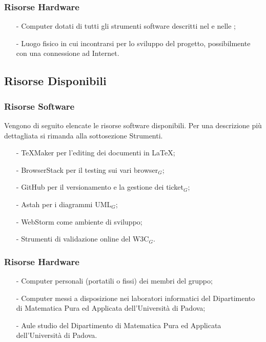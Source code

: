 \subsubsection{Risorse Hardware}
\begin{itemize}
	\item[-] Computer dotati di tutti gli strumenti software descritti nel \PdQ{} e nelle \NdP ;
	\item[-] Luogo fisico in cui incontrarsi per lo sviluppo del progetto, possibilmente con una connessione ad Internet.
\end{itemize}

\subsection{Risorse Disponibili}
\subsubsection{Risorse Software}
Vengono di seguito elencate le risorse software disponibili. Per una descrizione più dettagliata si rimanda alla sottosezione Strumenti.
\begin{itemize}
	\item[-] TeXMaker per l'editing dei documenti in \LaTeX;
	\item[-] BrowserStack per il testing sui vari browser$_G$;
	\item[-] GitHub per il versionamento e la gestione dei ticket$_G$;
	\item[-] Astah per i diagrammi UML$_G$;
	\item[-] WebStorm come ambiente di sviluppo;
	\item[-] Strumenti di validazione online del W3C$_G$.
\end{itemize}

\subsubsection{Risorse Hardware}
\begin{itemize}
	\item[-] Computer personali (portatili o fissi) dei membri del gruppo; 
	\item[-] Computer messi a disposizione nei laboratori informatici del Dipartimento di Matematica Pura ed Applicata dell'Università di Padova;
	\item[-] Aule studio del Dipartimento di Matematica Pura ed Applicata
	dell'Università di Padova. 
\end{itemize}